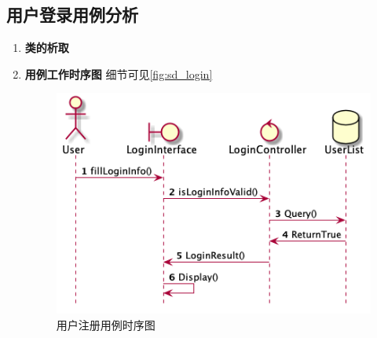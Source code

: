 	\subsection{用户登录用例分析} %
	\label{sub:用户登录用例分析_name}
	\begin{enumerate}
		\item \textbf{类的析取}

		\item \textbf{用例工作时序图}
		细节可见\autoref{fig:sd_login}

		\begin{figure}[htp]
		    \centering
		    \includegraphics[width=12cm]{figure/sequenceDiagram/sd_login.png}
		    \caption{用户注册用例时序图}
		    \label{fig:sd_login}
		\end{figure}
	\end{enumerate}
	

